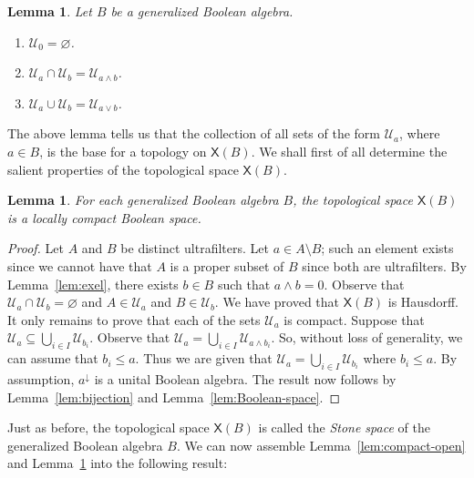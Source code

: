 \documentclass[a4paper]{amsart}
\newtheorem{lemma}[theorem]{Lemma}
\begin{document}
\begin{lemma}\label{lem:new-estonia} Let $B$ be a generalized Boolean algebra.
\begin{enumerate}
\item $\mathscr{U}_{0} = \varnothing$.
\item $\mathscr{U}_{a} \cap \mathscr{U}_{b} = \mathscr{U}_{a \wedge b}$.
\item $\mathscr{U}_{a} \cup \mathscr{U}_{b} = \mathscr{U}_{a \vee b}$.
\end{enumerate}
\end{lemma}

The above lemma tells us that the collection of all sets of the form $\mathscr{U}_{a}$, where $a \in B$,
is the base for a topology on $\mathsf{X}(B)$.
We shall first of all determine the salient properties of the topological space $\mathsf{X}(B)$.

\begin{lemma}\label{lem:lc-Boolean-space} 
For each generalized Boolean algebra $B$, the topological space $\mathsf{X}(B)$ is a locally compact Boolean space.
\end{lemma}
\begin{proof} Let $A$ and $B$ be distinct ultrafilters.
Let $a \in A \setminus B$;
such an element exists since we cannot have that $A$ is a proper subset of $B$ since both are ultrafilters.
By Lemma~\ref{lem:exel}, there exists $b \in B$ such that $a \wedge b = 0$.
Observe that $\mathscr{U}_{a} \cap \mathscr{U}_{b} = \varnothing$ and $A \in \mathscr{U}_{a}$ and $B \in \mathscr{U}_{b}$.
We have proved that $\mathsf{X}(B)$ is Hausdorff.
It only remains to prove that each of the sets $\mathscr{U}_{a}$ is compact.
Suppose that $\mathscr{U}_{a} \subseteq \bigcup_{i \in I} \mathscr{U}_{b_{i}}$.
Observe that $\mathscr{U}_{a} = \bigcup_{i \in I} \mathscr{U}_{a \wedge b_{i}}$.
So, without loss of generality, we can assume that $b_{i} \leq a$.
Thus we are given that $\mathscr{U}_{a} = \bigcup_{i \in I} \mathscr{U}_{b_{i}}$
where $b_{i} \leq a$.
By assumption, $a^{\downarrow}$ is a unital Boolean algebra.
The result now follows by Lemma~\ref{lem:bijection} and 
Lemma~\ref{lem:Boolean-space}. 
\end{proof}

Just as before, the topological space $\mathsf{X}(B)$ is called the {\em Stone space} of the generalized Boolean algebra $B$.
We can now assemble Lemma~\ref{lem:compact-open}  and Lemma~\ref{lem:lc-Boolean-space} into the following result:
\end{document}
